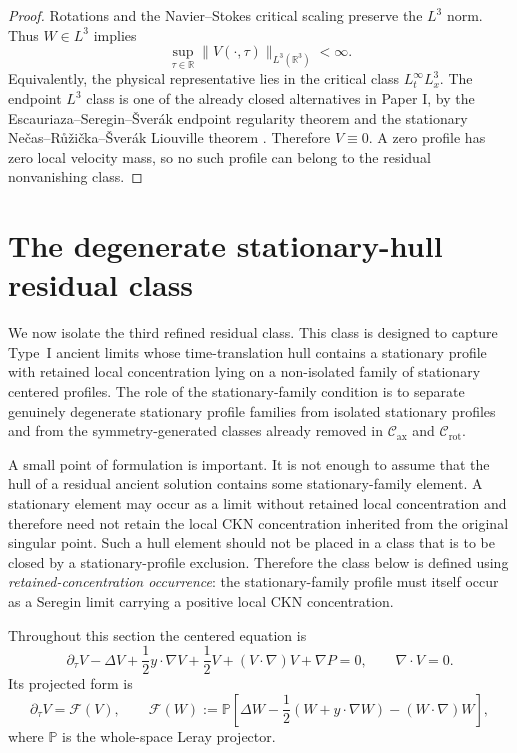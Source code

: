 \documentclass[11pt]{amsart}
\numberwithin{equation}{section}
\theoremstyle{plain}
\theoremstyle{definition}
\theoremstyle{remark}
\newcommand{\Cax}{\mathcal C_{\mathrm{ax}}}
\newcommand{\Crot}{\mathcal C_{\mathrm{rot}}}
\begin{document}
\begin{proof}
Rotations and the Navier--Stokes critical scaling preserve the \(L^3\) norm.
Thus \(W\in L^3\) implies
\[
   \sup_{\tau\in\mathbb R}\|V(\cdot,\tau)\|_{L^3(\mathbb R^3)}<\infty .
\]
Equivalently, the physical representative lies in the critical class
\(L^\infty_tL^3_x\).  The endpoint \(L^3\) class is one of the already closed
alternatives in Paper I, by the Escauriaza--Seregin--\v Sver\'ak endpoint
regularity theorem \cite{ESS2003} and the stationary
Ne\v cas--R\r u\v zi\v cka--\v Sver\'ak Liouville theorem \cite{NRS1996}.
Therefore
\(V\equiv0\).  A zero profile has zero local velocity mass, so no such profile
can belong to the residual
nonvanishing class.
\end{proof}


\section{The degenerate stationary-hull residual class}
\label{sec:R3-degenerate-stationary-hull}

We now isolate the third refined residual class.  This class is designed to
capture Type~I ancient limits whose time-translation hull contains a stationary
profile with retained local concentration lying on a non-isolated family of
stationary centered profiles.  The role of the stationary-family condition is to separate genuinely degenerate
stationary profile families from isolated stationary profiles and from the
symmetry-generated classes already removed in \(\Cax\) and \(\Crot\).

A small point of formulation is important.  It is not enough to assume that the
hull of a residual ancient solution contains some stationary-family element.  A
stationary element may occur as a limit without retained local concentration and
therefore need not retain the local CKN concentration inherited from the
original singular point.  Such a hull element should not be placed in a class
that is to be closed by a
stationary-profile exclusion.  Therefore the class below is defined using
\emph{retained-concentration occurrence}: the stationary-family profile must
itself occur as a Seregin limit carrying a positive local CKN concentration.

Throughout this section the centered equation is
\begin{equation}\label{eq:centered-R3}
   \partial_\tau V-\Delta V+\frac12 y\cdot\nabla V+\frac12 V
   +(V\cdot\nabla)V+\nabla P=0,
   \qquad \nabla\cdot V=0 .
\end{equation}
Its projected form is
\begin{equation}\label{eq:projected-centered-R3}
   \partial_\tau V=\mathcal F(V),
   \qquad
   \mathcal F(W)
   :=
   \mathbb P\left[
      \Delta W-\frac12(W+y\cdot\nabla W)-(W\cdot\nabla)W
   \right],
\end{equation}
where \(\mathbb P\) is the whole-space Leray projector.
\end{document}
